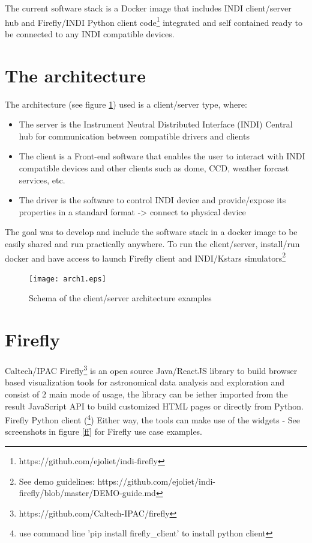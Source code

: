 \documentclass[11pt,twoside]{article}
\begin{document}
The current software stack is a Docker image that includes INDI client/server hub and Firefly/INDI Python client code\footnote{https://github.com/ejoliet/indi-firefly} integrated and self contained ready to be connected to any INDI compatible devices.

\clearpage

\section{The architecture}

The architecture (see figure \ref{arch1}) used is a client/server type, where:
\begin{itemize}
  \item The server is the Instrument Neutral Distributed Interface (INDI) Central hub for communication between compatible drivers and clients
  \item The client is a Front-end software that enables the user to interact with INDI compatible devices and other clients such as dome, CCD, weather forcast services, etc.
  \item The driver is the software to control INDI device and provide/expose its properties in a standard format -> connect to physical device
\end{itemize}

The goal was to develop and include the software stack in a docker image to be easily shared and run practically anywhere.
To run the client/server, install/run docker and have access to launch Firefly client and INDI/Kstars simulators\footnote{See demo guidelines: https://github.com/ejoliet/indi-firefly/blob/master/DEMO-guide.md}

\begin{figure}[ht]
   \texttt{[image: arch1.eps]}
    \caption{Schema of the client/server architecture examples}
    \label{arch1}
\end{figure}

\section{Firefly}

Caltech/IPAC Firefly\footnote{https://github.com/Caltech-IPAC/firefly} is an open source Java/ReactJS library to build browser based visualization tools for astronomical data analysis and exploration and consist of 2 main mode of usage, the library can be iether imported from the result JavaScript API to build customized HTML pages or directly from Python.
Firefly Python client (\footnote{use command line 'pip install firefly\_client' to install python client})
Either way, the tools can make use of the widgets - See screenshots in figure \ref{ff} for Firefly use case examples.
\end{document}
